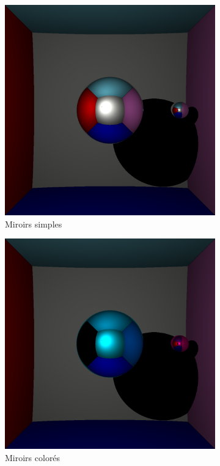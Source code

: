 \documentclass[12pt,a4paper,twoside]{report}
\begin{document}
\begin{figure}[H]
	\centering
	\begin{subfigure}{.45\textwidth}
		\centering
		\includegraphics[width=1.\linewidth]{be2_04}
		\caption{Miroirs simples}
		\label{fig:be2_04}
	\end{subfigure}
	\begin{subfigure}{.45\textwidth}
		\centering
		\includegraphics[width=1.\linewidth]{be2_05}
		\caption{Miroirs colorés}
		\label{fig:be2_05}
	\end{subfigure}
	\caption{}
\end{figure}
\end{document}
